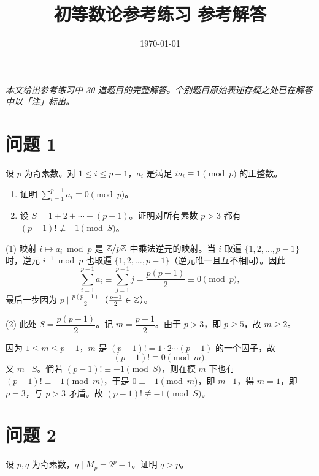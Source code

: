 \documentclass{article}
\title{\textbf{初等数论参考练习 \quad 参考解答}}
\author{}
\date{\today}
\begin{document}
\maketitle

\begin{center}
\itshape 本文给出参考练习中 30 道题目的完整解答。个别题目原始表述存疑之处已在解答中以「注」标出。
\end{center}

\bigskip

\section{问题 1}

设 $p$ 为奇素数。对 $1\le i\le p-1$，$a_i$ 是满足 $i a_i\equiv 1\pmod p$ 的正整数。

\begin{enumerate}[(1)]
  \item 证明 $\sum_{i=1}^{p-1} a_i\equiv 0\pmod p$。
  \item 设 $S=1+2+\cdots+(p-1)$。证明对所有素数 $p>3$ 都有 $(p-1)!\not\equiv -1\pmod S$。
\end{enumerate}

\begin{solution}
  (1) 映射 $i\mapsto a_i\bmod p$ 是 $\mathbb{Z}/p\mathbb{Z}$ 中乘法逆元的映射。当 $i$ 取遍 $\{1,2,\dots,p-1\}$ 时，逆元 $i^{-1}\bmod p$ 也取遍 $\{1,2,\dots,p-1\}$（逆元唯一且互不相同）。因此
  \[
    \sum_{i=1}^{p-1} a_i\equiv \sum_{j=1}^{p-1} j=\frac{p(p-1)}{2}\equiv 0\pmod p,
  \]
  最后一步因为 $p\mid \tfrac{p(p-1)}2$（$\tfrac{p-1}2\in\mathbb{Z}$）。

  (2) 此处 $S=\dfrac{p(p-1)}{2}$。记 $m=\dfrac{p-1}{2}$。由于 $p>3$，即 $p\ge 5$，故 $m\ge 2$。

  因为 $1\le m\le p-1$，$m$ 是 $(p-1)!=1\cdot 2\cdots (p-1)$ 的一个因子，故
  \[
    (p-1)!\equiv 0\pmod m .
  \]
  又 $m\mid S$。倘若 $(p-1)!\equiv -1\pmod S$，则在模 $m$ 下也有 $(p-1)!\equiv -1\pmod m$，于是 $0\equiv -1\pmod m$，即 $m\mid 1$，得 $m=1$，即 $p=3$，与 $p>3$ 矛盾。故 $(p-1)!\not\equiv -1\pmod S$。
\end{solution}

\section{问题 2}

设 $p,q$ 为奇素数，$q\mid M_p=2^p-1$。证明 $q>p$。
\end{document}
